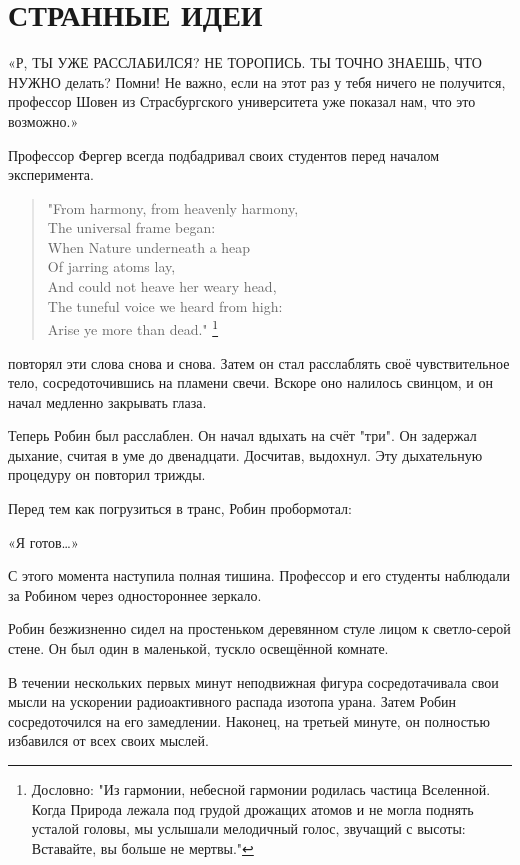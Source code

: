 \documentclass[a4paper,12pt]{book}
\begin{document}
\chapter{СТРАННЫЕ ИДЕИ}
\noindent\par«Р{, ТЫ УЖЕ РАССЛАБИЛСЯ? НЕ ТОРОПИСЬ. ТЫ ТОЧНО ЗНАЕШЬ, ЧТО НУЖНО} делать? Помни! Не важно, если на этот раз у тебя ничего не получится, профессор Шовен из Страсбургского университета уже показал нам, что это возможно.»
\par
Профессор Фергер всегда подбадривал своих студентов перед началом эксперимента.
\begin{quote}
"From harmony, from heavenly harmony,\\
The universal frame began:\\
When Nature underneath a heap\\
Of jarring atoms lay,\\
And could not heave her weary head,\\
The tuneful voice we heard from high:\\
Arise ye more than dead." \footnote[1]{Дословно: "Из гармонии, небесной гармонии родилась частица Вселенной. Когда Природа лежала под грудой дрожащих атомов и не могла поднять усталой головы, мы услышали мелодичный голос, звучащий с высоты: Вставайте, вы больше не мертвы."}
\end{quote}
 повторял эти слова снова и снова. Затем он стал расслаблять своё чувствительное тело, сосредоточившись на пламени свечи. Вскоре оно налилось свинцом, и он начал медленно закрывать глаза.
\par
Теперь Робин был расслаблен.  Он начал вдыхать на счёт "три". Он задержал дыхание, считая в уме до двенадцати. Досчитав, выдохнул. Эту дыхательную процедуру он повторил трижды.
\par
Перед тем как погрузиться в транс, Робин пробормотал:
\par
«Я готов…»\\
\par
С этого момента наступила полная тишина. Профессор и его студенты наблюдали за Робином через одностороннее зеркало.\\
\par
Робин безжизненно сидел на простеньком деревянном стуле лицом к светло-серой стене. Он был один в маленькой, тускло освещённой комнате.
\par
В течении нескольких первых минут неподвижная фигура сосредотачивала свои мысли на ускорении радиоактивного распада изотопа урана. Затем Робин сосредоточился на его замедлении. Наконец, на третьей минуте, он полностью избавился от всех своих мыслей.
\end{document}
